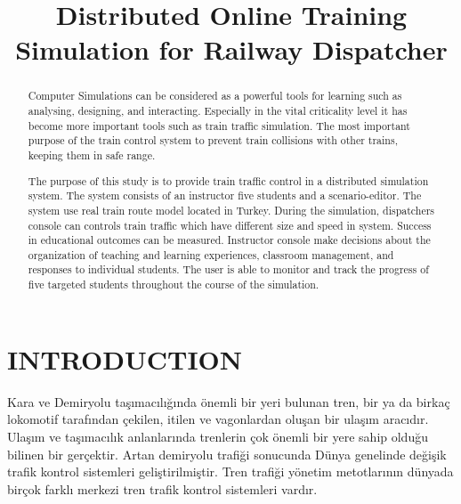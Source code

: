 \documentclass[conference]{IEEEtran}
\begin{document}
\title{Distributed Online Training Simulation for Railway Dispatcher }



\author{


}

\maketitle

\begin{abstract}
Computer Simulations can be considered as a powerful tools for learning such as analysing, designing, and interacting. Especially in the vital criticality level it has become more important tools such as train traffic simulation.
The most important purpose of the train control system to prevent train collisions with other trains, keeping them in safe range.

The purpose of this study is to provide train traffic control in a distributed simulation system. The system consists of an instructor five students and a scenario-editor. The system use real train route model located in Turkey.  During the simulation, dispatchers console can controls train traffic which have different  size and speed in system. Success in educational outcomes can be measured. Instructor console make decisions about the organization of teaching and learning 
experiences, classroom management, and responses to 
individual students. The user is able to monitor and track the progress of five targeted students throughout the course of the simulation. 
\end{abstract}

\section{INTRODUCTION}
Kara ve Demiryolu taşımacılığında önemli bir yeri bulunan tren, bir ya da birkaç lokomotif tarafından çekilen, itilen ve vagonlardan oluşan bir ulaşım aracıdır. Ulaşım ve taşımacılık anlanlarında trenlerin çok önemli bir yere sahip olduğu bilinen bir gerçektir. 
Artan demiryolu trafiği sonucunda Dünya genelinde değişik trafik kontrol sistemleri geliştirilmiştir. Tren trafiği yönetim metotlarının dünyada birçok farklı merkezi tren trafik kontrol sistemleri vardır.
\end{document}
